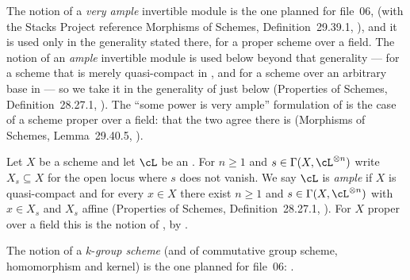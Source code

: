\begin{remark}
\label{rem:pc-sc-ample}
The notion of a \emph{very ample} invertible module is the one planned
for file~06,  (with the Stacks Project reference
Morphisms of Schemes, Definition~29.39.1,
), and it is used
only in the generality stated there, for a proper scheme over a field.
The notion of an \emph{ample} invertible module is used below beyond
that generality --- for a scheme that is merely quasi-compact in
, and for a scheme over an
arbitrary base in  --- so we take it in
the generality of  just below (Properties of
Schemes, Definition~28.27.1,
).  The ``some power
is very ample'' formulation of  is the case of a
scheme proper over a field: that the two agree there is
 (Morphisms of Schemes,
Lemma~29.40.5, ).
\end{remark}

\begin{definition}
\label{def:pc-ample}
Let $X$ be a scheme and let $\cL$ be an
.  For
$n\ge1$ and $s\in\Gamma(X,\cL^{\otimes n})$ write $X_s\subseteq X$ for
the open locus where $s$ does not vanish.  We say $\cL$ is
\emph{ample} if $X$ is quasi-compact and for every $x\in X$ there
exist $n\ge1$ and $s\in\Gamma(X,\cL^{\otimes n})$ with $x\in X_s$ and
$X_s$ affine (Properties of Schemes, Definition~28.27.1,
).  For $X$ proper
over a field this is the notion of ,
by .
\end{definition}

\begin{remark}\label{rem:pc-sc-group}
The notion of a $k$-\emph{group scheme} (and of commutative group
scheme, homomorphism and kernel) is the one planned for file~06:
.
\end{remark}

